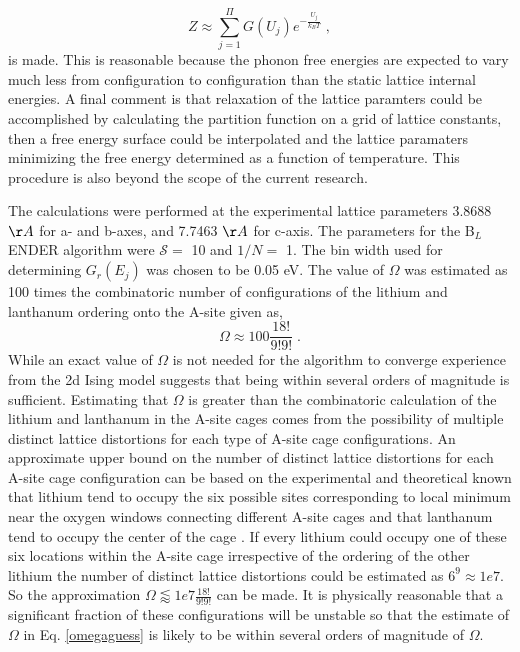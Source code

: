 \documentclass[aps,pre,reprint,superscriptaddress,showkeys]{revtex4-2}
\begin{document}
 \begin{equation}
 Z\approx \sum_{j=1}^{\Pi}G(U_j)e^{-\frac{U_j}{k_BT}}\;,
 \end{equation}
 is made. This is reasonable because the phonon free energies are expected to vary much less from configuration to configuration than the static lattice internal energies. A final comment is that relaxation of the lattice paramters could be accomplished by calculating the partition function on a grid of lattice constants, then a free energy surface could be interpolated and the lattice paramaters minimizing the free energy determined as a function of temperature. This procedure is also beyond the scope of the current research. 
 
  The calculations were performed at the experimental lattice parameters 3.8688 $\AA$ for a- and b-axes, and 7.7463 $\AA$ for c-axis. The parameters for the B$_L$ENDER algorithm were $\mathcal{S}=$ 10 and $1/N=$ 1. The bin width used for determining $G_r(E_j)$ was chosen to be 0.05 eV. The value of $\Omega$ was estimated as 100 times the combinatoric number of configurations of the lithium and lanthanum ordering onto the A-site  given as, 
\begin{equation}
\Omega \approx 100\frac{18!}{9!9!} \;.
\label{omegaguess}
\end{equation}
While an exact value of $\Omega$ is not needed for the algorithm to converge experience from the 2d Ising model suggests that being within several orders of magnitude is sufficient. Estimating that $\Omega$ is greater than the combinatoric calculation of the lithium and lanthanum in the A-site cages comes from the possibility of multiple distinct lattice distortions for each type of A-site cage configurations. An approximate upper bound on the number of distinct lattice distortions for each A-site cage configuration can be based on the experimental and theoretical known that lithium tend to occupy the six possible sites corresponding to local minimum near the oxygen windows connecting different  A-site cages and that lanthanum tend to occupy the center of the cage \cite{Asitedistribution,imaginaryphonons,Li_La_ordering_computational,lithiumpos}. If every lithium could occupy one of these six locations within the A-site cage irrespective of the ordering of the other lithium the number of distinct lattice distortions could be estimated as $6^{9}\approx 1e7$. So the approximation $\Omega  \lessapprox 1e7  \frac{18!}{9!9!}$ can be made. It is physically reasonable that a significant fraction of these configurations will be unstable so that the estimate of $\Omega$ in Eq. \ref{omegaguess} is likely to be within several orders of magnitude of  $\Omega$. 
\end{document}

